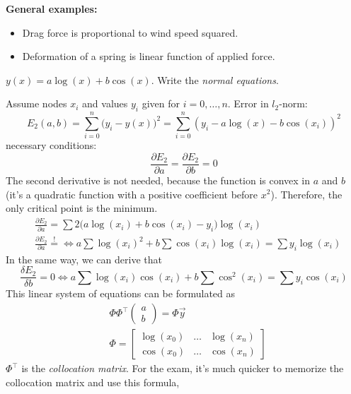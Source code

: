 \textbf{General examples:}
\begin{itemize}
    \item {
        Drag force is proportional to wind speed squared.
    }
    \item {
        Deformation of a spring is linear function of applied force.
    }
\end{itemize}

\begin{example}
    $y(x) = a \log(x) + b\cos(x)$.
    Write the \textit{normal equations}.

    Assume nodes $x_i$ and values $y_i$ given for
    $i = 0, \dots, n$. Error in $l_2$-norm:
    \[
        E_2(a, b) = \sum_{i=0}^n \bigl(y_i - y(x)\bigr)^2 = 
        \sum_{i=0}^n (y_i - a\log(x) - b\cos(x_i))^2
    \]
    necessary conditions:
    \[
        \frac{\partial E_2}{\partial a} = \frac{\partial E_2}{\partial b} = 0
    \]
    The second derivative is not needed, because the function is convex in $a$ and $b$
    (it's a quadratic function with a positive coefficient before $x^2$).
    Therefore, the only critical point is the minimum.
    \begin{align*}
        &\frac{\partial E_2}{\partial a} =
        \sum 2\bigl(a \log(x_i) + b\cos(x_i) - y_i\bigr) \log(x_i)\\
        &\frac{\partial E_2}{\partial a} \overset{!}{=} \iff
        a \sum \log(x_i)^2 + b\sum \cos(x_i) \log(x_i) = 
        \sum y_i \log(x_i)
    \end{align*}
    In the same way, we can derive that
    \[
        \frac{\delta E_2}{\delta b} = 0 \iff
        a \sum \log(x_i) \cos(x_i) + b\sum \cos^2(x_i) = 
        \sum y_i \cos(x_i)
    \]
    This linear system of equations can be formulated as 
    \begin{align*}
        &\Phi \Phi^\intercal \begin{pmatrix}
            a \\ b
        \end{pmatrix} = \Phi \vec{y}
        \\&
        \Phi = \begin{bmatrix}
            \log(x_0) & \dots & \log(x_n)\\
            \cos(x_0) & \dots & \cos(x_n)
        \end{bmatrix}
    \end{align*}
    $\Phi^\intercal$ is the \textit{collocation matrix}.
    For the exam, it's much quicker
    to memorize the collocation matrix and use this formula,

\end{example}

